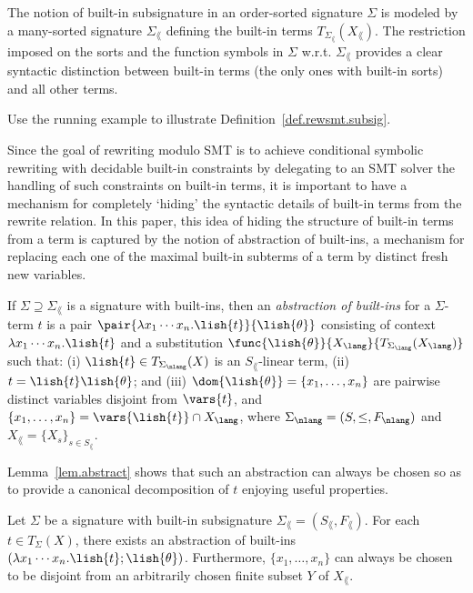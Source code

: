 The notion of built-in subsignature in an order-sorted signature
$\Sigma$ is modeled by a many-sorted signature $\Sigma_\lang$ defining
the built-in terms $T_{\Sigma_\lang}(X_\lang)$. The restriction
imposed on the sorts and the function symbols in $\Sigma$
w.r.t. $\Sigma_\lang$ provides a clear syntactic distinction between
built-in terms (the only ones with built-in sorts) and all other
terms.

\begin{example}
  Use the running example to illustrate
  Definition~\ref{def.rewsmt.subsig}.
\end{example}

Since the goal of rewriting modulo SMT is to achieve conditional
symbolic rewriting with decidable built-in constraints by delegating
to an SMT solver the handling of such constraints on built-in terms,
it is important to have a mechanism for completely `hiding' the
syntactic details of built-in terms from the rewrite relation. In this
paper, this idea of hiding the structure of built-in terms from a term
is captured by the notion of abstraction of built-ins, a mechanism for
replacing each one of the maximal built-in subterms of a term by
distinct fresh new variables.


\begin{definition}
If $\Sigma \supseteq \Sigma_\lang$ is a signature with built-ins, then
an {\em abstraction of built-ins} for a $\Sigma$-term $t$ is a pair
$\pair{\lambda x_1 \cdots x_n.\lish{t}}{\lish{\theta}}$ consisting of
context $\lambda x_1\cdots x_n.\lish{t}$ and a substitution
$\func{\lish{\theta}}{X_\lang}{T_{\Sigma_\lang}(X_\lang)}$ such that:
(i) $\lish{t} \in T_{\Sigma_\nlang}(X)$ is an $S_\lang$-linear term,
(ii) $t = \lish{t}\lish{\theta}$; and (iii) $\dom{\lish{\theta}} =
\{x_1,\ldots,x_n\}$ are pairwise distinct variables disjoint from
$\vars{t}$, and $\{x_1,\ldots,x_n\} = \vars{\lish{t}}\cap X_\lang$,
where $\Sigma_\nlang = (S,\leq, F_\nlang)$ and $X_\lang = \{X_s\}_{s
  \in S_\lang}$.
\end{definition}

Lemma~\ref{lem.abstract} shows that such an abstraction can always be
chosen so as to provide a canonical decomposition of $t$ enjoying
useful properties.

\begin{lemma}\label{lem.abstract}
  Let $\Sigma$ be a signature with built-in subsignature
  $\Sigma_\lang=(S_\lang,F_\lang)$. For each $t\in T_{\Sigma}(X)$,
  there exists an abstraction of built-ins $(\lambda x_1\cdots
  x_n.\lish{t};\lish{\theta})$.  Furthermore, $\{x_1,\ldots,x_n\}$ can
  always be chosen to be disjoint from an arbitrarily chosen finite
  subset $Y$ of $X_\lang$.
\end{lemma}

